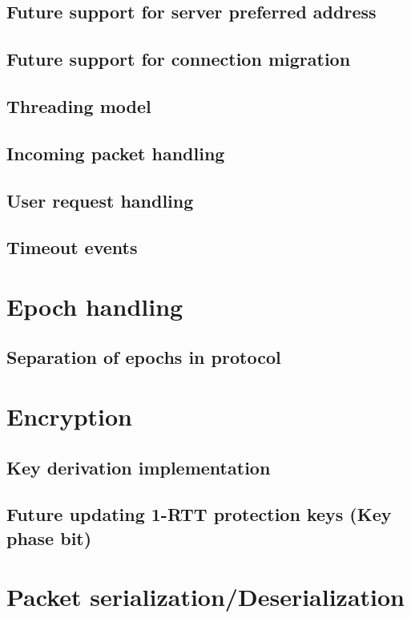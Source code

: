 \subsection{Future support for server preferred address}
\subsection{Future support for connection migration}
\subsection{Threading model}
\subsection{Incoming packet handling}
\subsection{User request handling}
\subsection{Timeout events}


\section{Epoch handling}
\subsection{Separation of epochs in protocol}

\section{Encryption}

\subsection{Key derivation implementation}
\subsection{Future updating 1-RTT protection keys (Key phase bit)}


\section{Packet serialization/Deserialization}


